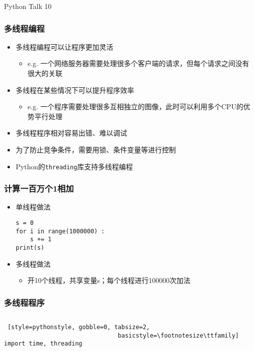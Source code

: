 


\begin{CJK}{UTF8}{gbsn}

\PreFirstFrame
\begin{frame} [fragile]
	\centerline{\fontsize{42}{42}\selectfont Python Talk 10}
\end{frame}
\PostFirstFrame

\begin{frame}
	\frametitle{多线程编程}
	\begin{itemize}
	\item 多线程编程可以让程序更加灵活
		\begin{itemize}
		\item e.g. 一个网络服务器需要处理很多个客户端的请求，但每个请求之间没有很大的关联
		\end{itemize}
	\item 多线程在某些情况下可以提升程序效率
		\begin{itemize}
		\item e.g. 一个程序需要处理很多互相独立的图像，此时可以利用多个CPU的优势平行处理
		\end{itemize}
	\item 多线程程序相对容易出错、难以调试
	\item 为了防止竞争条件，需要用锁、条件变量等进行控制
	\item Python的\texttt{threading}库支持多线程编程
	\end{itemize}
\end{frame}

\begin{frame} [fragile]
	\frametitle{计算一百万个1相加}
	\begin{itemize}
	\item 单线程做法
	\begin{lstlisting}[style=pythonstyle, gobble=0]
s = 0
for i in range(1000000) :
	s += 1
print(s)
	\end{lstlisting}
	\item 多线程做法
		\begin{itemize}
		\item 开10个线程，共享变量s；每个线程进行100000次加法
		\end{itemize}
	\end{itemize}
\end{frame}

\begin{frame} [fragile]
	\frametitle{多线程程序}
	\begin{columns}[T]
		\begin{column}[T]{.5\textwidth}
			\begin{lstlisting} [style=pythonstyle, gobble=0, tabsize=2, 
								basicstyle=\footnotesize\ttfamily]
import time, threading


\end{lstlisting}
\end{column}
\end{columns}
\end{frame}
\end{CJK}
